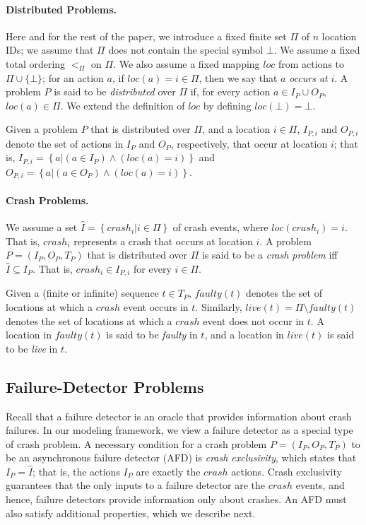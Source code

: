 \documentclass[11pt]{article}
\numberwithin{theorem}{section}
\newcommand{\set}[1]{\left\{#1\right\}}
\begin{document}
\paragraph{Distributed Problems.}
Here and for the rest of the paper, we introduce a fixed finite set
$\Pi$ of $n$ location IDs; we assume that $\Pi$ does not contain the
special symbol $\bot$. We assume a fixed total ordering $<_\Pi$ on $\Pi$.
We also assume a fixed mapping $loc$ from actions to $\Pi \cup \{ \bot
\}$; for an action $a$, if $loc(a) = i \in \Pi$, then we say that $a$
\emph{occurs at} $i$. 
A problem $P$ is said to be \emph{distributed} over $\Pi$ if, for every
action $a \in I_P \cup O_P$, $loc(a) \in \Pi$. 
We extend the definition of $loc$ by defining $loc(\bot) = \bot$.


Given a problem $P$ that is distributed over $\Pi$, and a location $i
\in \Pi$, $I_{P,i}$ and $O_{P,i}$ denote the set of actions in $I_P$
and $O_P$, respectively, that occur at location $i$;
that is, $I_{P,i} = \set{a|(a\in I_P) \wedge (loc(a)=i)}$ and $O_{P,i}
= \set{a|(a\in O_P) \wedge (loc(a)=i)}$. 



\paragraph{Crash Problems.}
We assume a set $\hat{I} = \set{crash_i \vert i\in \Pi}$ of crash
events, where $loc(crash_i) = i$. 
That is, $crash_i$ represents a crash that occurs at location $i$.
A problem $P = (I_P,O_P,T_P)$ that is distributed over $\Pi$ is said
to be a \emph{crash problem} iff $\hat{I} \subseteq I_P$. 
That is, $crash_i \in I_{P,i}$ for every $i \in \Pi$.

Given a (finite or infinite) sequence $t \in T_P$, $faulty(t)$ denotes
the set of locations at which a $crash$ event occurs in $t$. 
Similarly, $live(t) = \Pi \setminus faulty(t)$ denotes the set of
locations at which a $crash$ event does not occur in $t$. 
A location in $faulty(t)$ is said to be \emph{faulty} in $t$, and
a location in $live(t)$ is said to be \emph{live} in $t$. 



\subsection{Failure-Detector Problems}
\label{subsec:FDproblems}

Recall that a failure detector is an oracle that provides information
about crash failures. 
In our modeling framework, we view a failure detector as a special
type of crash problem.
A necessary condition for a crash problem $P = (I_P,O_P,T_P)$ to
be an asynchronous failure detector (AFD) is \emph{crash exclusivity},
which states that $I_P = \hat{I}$; that is, the actions $I_P$ are
exactly the $crash$ actions. 
Crash exclusivity guarantees that the only inputs to a failure
detector are the $crash$ events, and hence, failure detectors
provide information only about crashes. 
An AFD must also satisfy additional properties, which we describe next.
\end{document}
